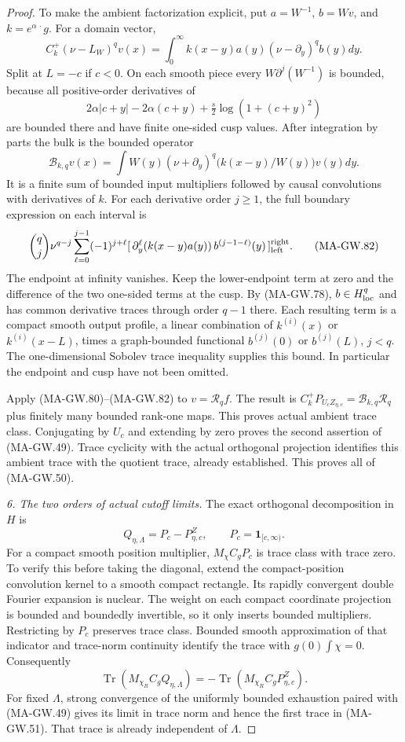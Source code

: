 \begin{proof}
To make the ambient factorization explicit, put \(a=W^{-1}\),
\(b=Wv\), and \(k=e^{\alpha\,\cdot}g\).  For a domain vector,
\[
 C_k^+(\nu-L_W)^qv(x)
       =\int_0^\infty k(x-y)a(y)(\nu-\partial_y)^qb(y)dy .
 \tag{MA-GW.80}
\]
Split at \(L=-c\) if \(c<0\).
On each smooth piece every \(W\partial^j(W^{-1})\)
is bounded, because all positive-order derivatives of
\[
 2\alpha|c+y|-2\alpha(c+y)+\tfrac s2\log(1+(c+y)^2)
\]
are bounded there and have finite one-sided cusp values.
After integration by parts the bulk is the bounded operator
\[
 \mathcal B_{k,q}v(x)
   =\int W(y)(\nu+\partial_y)^q
                         \bigl(k(x-y)/W(y)\bigr)v(y)dy .
 \tag{MA-GW.81}
\]
It is a finite sum of bounded input multipliers followed
by causal convolutions with derivatives of \(k\).
For each derivative order \(j\ge1\), the full boundary
expression on each interval is
\[
 \binom qj\nu^{q-j}
 \sum_{\ell=0}^{j-1}(-1)^{j+\ell}
   [\,\partial_y^\ell(k(x-y)a(y))\,
                          b^{(j-1-\ell)}(y)\,]_{\rm left}^{\rm right}.
 \tag{MA-GW.82}
\]
The endpoint at infinity vanishes.
Keep the lower-endpoint term at zero and the difference
of the two one-sided terms at the cusp.
By (MA-GW.78), \(b\in H^q_{\rm loc}\) and has common
derivative traces through order \(q-1\) there.
Each resulting term is a compact smooth output profile,
a linear combination of \(k^{(i)}(x)\) or \(k^{(i)}(x-L)\),
times a graph-bounded functional \(b^{(j)}(0)\) or
\(b^{(j)}(L)\), \(j<q\).
The one-dimensional Sobolev trace inequality supplies
this bound.  In particular the endpoint and cusp have
not been omitted.

Apply (MA-GW.80)--(MA-GW.82) to \(v=\mathcal R_qf\).
The result is
\(C_k^+P_{U_cZ_{\eta,c}}=\mathcal B_{k,q}\mathcal R_q\)
plus finitely many bounded rank-one maps.
This proves actual ambient trace class.
Conjugating by \(U_c\) and extending by zero proves
the second assertion of (MA-GW.49).
Trace cyclicity with the actual orthogonal projection
identifies this ambient trace with the quotient trace,
already established.  This proves all of (MA-GW.50).

\emph{6. The two orders of actual cutoff limits.}
The exact orthogonal decomposition in \(H\) is
\[
                 Q_{\eta,\Lambda}=P_c-P_{\eta,c}^Z,
                   \qquad P_c=\mathbf1_{[c,\infty)} .
\]
For a compact smooth position multiplier, \(M_\chi C_gP_c\)
is trace class with trace zero.  To verify this before
taking the diagonal, extend the compact-position
convolution kernel to a smooth compact rectangle.
Its rapidly convergent double Fourier expansion is nuclear.
The weight on each compact coordinate projection is bounded
and boundedly invertible, so it only inserts bounded
multipliers.  Restricting by \(P_c\) preserves trace class.
Bounded smooth approximation of that indicator and
trace-norm continuity identify the trace with
\(g(0)\int\chi=0\).
Consequently
\[
 \operatorname{Tr}(M_{\chi_R}C_gQ_{\eta,\Lambda})
     =-\operatorname{Tr}(M_{\chi_R}C_gP_{\eta,c}^Z).
 \tag{MA-GW.83}
\]
For fixed \(\Lambda\), strong convergence of the uniformly
bounded exhaustion paired with (MA-GW.49) gives its limit
in trace norm and hence the first trace in (MA-GW.51).
That trace is already independent of \(\Lambda\).


\end{proof}
